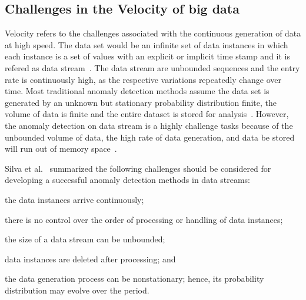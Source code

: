 \subsection{Challenges in the Velocity of big data}

Velocity refers to the challenges associated with
the continuous generation of data at
high speed.
The data set would be 
an infinite set of data instances in which
each instance is a
set of values with an explicit or
implicit time stamp 
and it is refered as data stream~\cite{sadik2014research}.
The data stream are unbounded
sequences and the entry rate is continuously high,
as the respective variations repeatedly
change over time.
Most traditional anomaly detection methods assume 
the data set is generated
by an unknown but stationary probability distribution 
finite,
the volume of data is finite and 
the entire dataset is stored for analysis~\cite{silva2013data}.
However, 
the anomaly detection on data stream is 
a highly challenge tasks because of
the unbounded volume of data,
the high rate of data generation,
and data be stored will run out of memory space~\cite{sadik2014research}.

Silva et al.~\cite{silva2013data} summarized
the following challenges should be considered for developing
a successful anomaly detection methods in data streams: 
\begin{inparaenum}
  \item the data instances arrive continuously;
  \item there is no control over the order of processing or
  handling of data instances;
  \item the
  size of a data stream can be unbounded;
  \item data instances are deleted after processing;
  and
  \item the data generation process can be nonstationary;
  hence,
  its probability
  distribution may evolve over the period.
\end{inparaenum}

